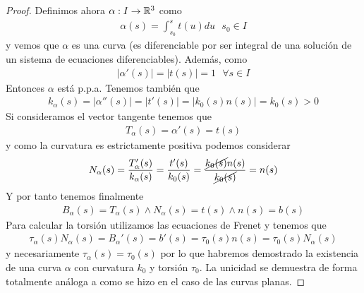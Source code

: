 \begin{teo}
\begin{proof}
        Definimos ahora $\alpha:I\to \mathbb{R}^3$ como 
        \begin{gather*}
            \alpha(s)=\int_{s_0}^{s} t(u) du \ \ \ s_0\in I
        \end{gather*}
        y vemos que $\alpha$ es una curva (es diferenciable por ser integral de una solución de un sistema de ecuaciones diferenciables). Además, como 
        \begin{gather*}
            |\alpha'(s)| = |t(s)|=1\ \ \ \forall s \in I
        \end{gather*}
        Entonces $\alpha$ está p.p.a. Tenemos también que 
        \begin{gather*}
            k_\alpha(s) = |\alpha''(s)| = |t'(s)| = |k_0(s)n(s)| = k_0(s)>0
        \end{gather*}
        Si consideramos el vector tangente tenemos que 
        \begin{gather*}
            T_\alpha(s) = \alpha'(s) = t(s)
        \end{gather*}
        y como la curvatura es estrictamente positiva podemos considerar 
        \begin{gather*}
            N_\alpha(s) = \frac{T'_\alpha(s)}{k_\alpha(s)} = \frac{t'(s)}{k_0(s)} = \frac{\cancel{k_0(s)}n(s)}{\cancel{k_0(s)}} = n(s)
        \end{gather*}
        Y por tanto tenemos finalmente
        \begin{gather*}
            B_\alpha(s) = T_\alpha(s) \wedge N_\alpha(s) = t(s) \wedge n(s) = b(s)
        \end{gather*}
        Para calcular la torsión utilizamos las ecuaciones de Frenet y tenemos que 
        \begin{gather*}
            \tau_\alpha(s)N_\alpha(s) = B_\alpha'(s) = b'(s) = \tau_0(s)n(s) = \tau_0(s)N_\alpha(s)
        \end{gather*}
        y necesariamente $\tau_\alpha(s)=\tau_0(s)$ por lo que habremos demostrado la existencia de una curva $\alpha$ con curvatura $k_0$ y torsión $\tau_0$. La unicidad se demuestra de forma totalmente análoga a como se hizo en el caso de las curvas planas.
    \end{proof}
\end{teo}